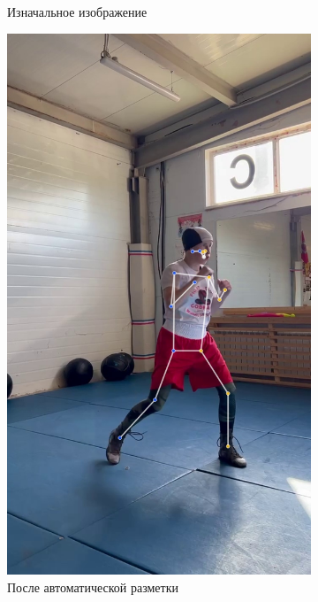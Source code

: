 \begin{figure}[h]
\begin{subfigure}[b]{0.32\textwidth}
	\caption{Изначальное изображение}
\end{subfigure}
\begin{subfigure}[b]{0.32\textwidth}
	\centering
	\includegraphics[width=\textwidth]{./images/data_info/pose_markup_examples/auto_labeled}
	\caption{После автоматической разметки}
\end{subfigure}
\begin{subfigure}[b]{0.32\textwidth}
	\centering

\end{subfigure}
\end{figure}
